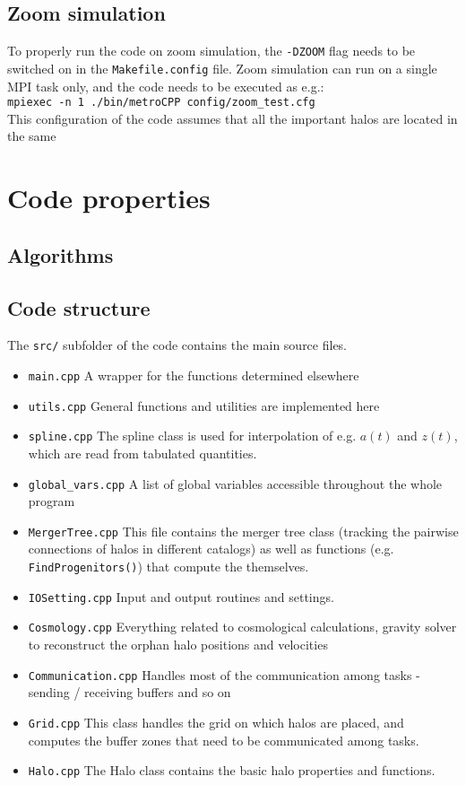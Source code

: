 \documentclass{article}
\begin{document}
\subsection{Zoom simulation}
To properly run the code on zoom simulation, the \texttt{-DZOOM} flag needs to be switched on in the \texttt{Makefile.config} file.
Zoom simulation can run on a single MPI task only, and the code needs to be executed as e.g.:\\

\texttt{mpiexec -n 1 ./bin/metroCPP config/zoom\_test.cfg}\\

This configuration of the code assumes that all the important halos are located in the same 

\section{Code properties}
\label{sec:advanced}


\subsection{Algorithms}

\subsection{Code structure}
The \texttt{src/} subfolder of the code contains the main source files.

\begin{itemize}
\item{\texttt{main.cpp}} A wrapper for the functions determined elsewhere
\item{\texttt{utils.cpp}} General functions and utilities are implemented here
\item{\texttt{spline.cpp}} The spline class is used for interpolation of e.g. $a(t)$ and $z(t)$, which are
read from tabulated quantities.
\item{\texttt{global\_vars.cpp}} A list of global variables accessible throughout the whole program
\item{\texttt{MergerTree.cpp}} This file contains the merger tree class (tracking the pairwise connections of 
halos in different catalogs) as well as functions (e.g. \texttt{FindProgenitors()}) 
that compute the  themselves.
\item{\texttt{IOSetting.cpp}} Input and output routines and settings.
\item{\texttt{Cosmology.cpp}} Everything related to cosmological calculations, gravity solver to reconstruct the orphan halo 
positions and velocities 
\item{\texttt{Communication.cpp}} Handles most of the communication among tasks - sending / receiving buffers and so on
\item{\texttt{Grid.cpp}} This class handles the grid on which halos are placed, and computes the buffer zones that need to 
be communicated among tasks. 
\item{\texttt{Halo.cpp}} The Halo class contains the basic halo properties and functions.
\end{itemize}
\end{document}
